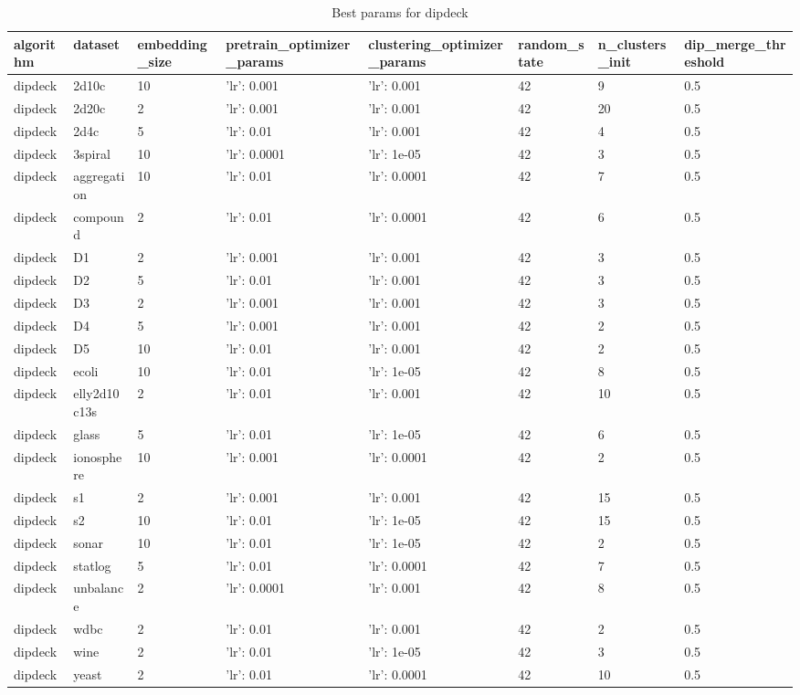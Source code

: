 \clearpage

\begin{table}[H]
\centering
\caption{Best params for dipdeck}
\label{S21_Table}
\begin{tabular}{|l|l|l|l|l|l|l|l|}
\hline
algorithm & dataset & embedding\_size & pretrain\_optimizer\_params & clustering\_optimizer\_params & random\_state & n\_clusters\_init & dip\_merge\_threshold \\
\hline
dipdeck & 2d10c & 10 & {'lr': 0.001} & {'lr': 0.001} & 42 & 9 & 0.5 \\
\hline
dipdeck & 2d20c & 2 & {'lr': 0.001} & {'lr': 0.001} & 42 & 20 & 0.5 \\
\hline
dipdeck & 2d4c & 5 & {'lr': 0.01} & {'lr': 0.001} & 42 & 4 & 0.5 \\
\hline
dipdeck & 3spiral & 10 & {'lr': 0.0001} & {'lr': 1e-05} & 42 & 3 & 0.5 \\
\hline
dipdeck & aggregation & 10 & {'lr': 0.01} & {'lr': 0.0001} & 42 & 7 & 0.5 \\
\hline
dipdeck & compound & 2 & {'lr': 0.01} & {'lr': 0.0001} & 42 & 6 & 0.5 \\
\hline
dipdeck & D1 & 2 & {'lr': 0.001} & {'lr': 0.001} & 42 & 3 & 0.5 \\
\hline
dipdeck & D2 & 5 & {'lr': 0.01} & {'lr': 0.001} & 42 & 3 & 0.5 \\
\hline
dipdeck & D3 & 2 & {'lr': 0.001} & {'lr': 0.001} & 42 & 3 & 0.5 \\
\hline
dipdeck & D4 & 5 & {'lr': 0.001} & {'lr': 0.001} & 42 & 2 & 0.5 \\
\hline
dipdeck & D5 & 10 & {'lr': 0.01} & {'lr': 0.001} & 42 & 2 & 0.5 \\
\hline
dipdeck & ecoli & 10 & {'lr': 0.01} & {'lr': 1e-05} & 42 & 8 & 0.5 \\
\hline
dipdeck & elly2d10c13s & 2 & {'lr': 0.01} & {'lr': 0.001} & 42 & 10 & 0.5 \\
\hline
dipdeck & glass & 5 & {'lr': 0.01} & {'lr': 1e-05} & 42 & 6 & 0.5 \\
\hline
dipdeck & ionosphere & 10 & {'lr': 0.001} & {'lr': 0.0001} & 42 & 2 & 0.5 \\
\hline
dipdeck & s1 & 2 & {'lr': 0.001} & {'lr': 0.001} & 42 & 15 & 0.5 \\
\hline
dipdeck & s2 & 10 & {'lr': 0.01} & {'lr': 1e-05} & 42 & 15 & 0.5 \\
\hline
dipdeck & sonar & 10 & {'lr': 0.01} & {'lr': 1e-05} & 42 & 2 & 0.5 \\
\hline
dipdeck & statlog & 5 & {'lr': 0.01} & {'lr': 0.0001} & 42 & 7 & 0.5 \\
\hline
dipdeck & unbalance & 2 & {'lr': 0.0001} & {'lr': 0.001} & 42 & 8 & 0.5 \\
\hline
dipdeck & wdbc & 2 & {'lr': 0.01} & {'lr': 0.001} & 42 & 2 & 0.5 \\
\hline
dipdeck & wine & 2 & {'lr': 0.01} & {'lr': 1e-05} & 42 & 3 & 0.5 \\
\hline
dipdeck & yeast & 2 & {'lr': 0.01} & {'lr': 0.0001} & 42 & 10 & 0.5 \\
\hline
\end{tabular}
\end{table}

